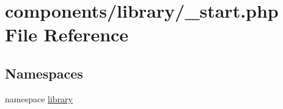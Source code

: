 \hypertarget{components_2library_2__start_8php}{
\section{components/library/\_\-start.php File Reference}
\label{components_2library_2__start_8php}
}
\subsection*{Namespaces}
\begin{CompactItemize}
\item 
namespace \hyperlink{namespacelibrary}{library}
\end{CompactItemize}
